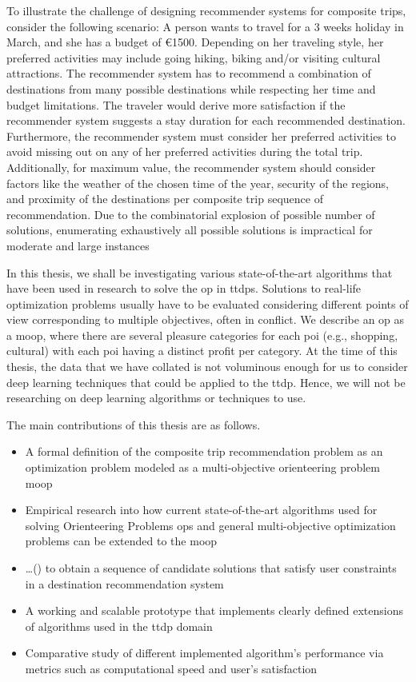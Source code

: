 To illustrate the challenge of designing recommender systems for composite trips, consider the following scenario: A person wants to travel for a 3 weeks holiday in March, and she has a budget of €1500. Depending on her traveling style, her preferred activities may include going hiking, biking and/or visiting cultural attractions. The recommender system has to recommend a combination of destinations from many possible destinations while respecting her time and budget limitations. The traveler would derive more satisfaction if the recommender system suggests a stay duration for each recommended destination. Furthermore, the recommender system must consider her preferred activities to avoid missing out on any of her preferred activities during the total trip. Additionally, for maximum value, the recommender system should consider factors like the weather of the chosen time of the year, security of the regions, and proximity of the destinations per composite trip sequence of recommendation. Due to the combinatorial explosion of possible number of solutions, enumerating exhaustively all possible solutions is impractical for moderate and large instances

In this thesis, we shall be investigating various state-of-the-art algorithms that have been used in research to solve the \gls{op} in \glspl{ttdp}. Solutions to real-life optimization problems usually have to be evaluated considering different points of view corresponding to multiple objectives, often in conflict.  We describe an \gls{op} as a \gls{moop}, where there are several pleasure categories for each \gls{poi} (e.g., shopping, cultural) with each \gls{poi} having a distinct profit per category. At the time of this thesis, the data that we have collated is not voluminous enough for us to consider deep learning techniques that could be applied to the \gls{ttdp}. Hence, we will not be researching on deep learning algorithms or techniques to use.

The main contributions of this thesis are as follows.

\begin{itemize}
    \item A formal definition of the composite trip recommendation problem as an optimization problem modeled as a multi-objective orienteering problem \gls{moop}
    \item Empirical research into how current state-of-the-art algorithms used for solving Orienteering Problems \glspl{op} and general multi-objective optimization problems can be extended to the \gls{moop}
    \item \ldots () to obtain a sequence of candidate solutions that satisfy user constraints in a destination recommendation system
    \item A working and scalable prototype that implements clearly defined extensions of algorithms used in the \gls{ttdp} domain
    \item Comparative study of different implemented algorithm's performance via metrics such as computational speed and user's satisfaction 
\end{itemize}



